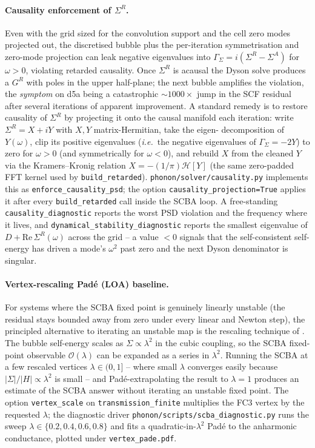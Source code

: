\paragraph{Causality enforcement of $\Sigma^{R}$.}
Even with the grid sized for the convolution support and the cell
zero modes projected out, the discretised bubble plus the
per-iteration symmetrisation and zero-mode projection can leak
negative eigenvalues into $\Gamma_{\Sigma}=i(\Sigma^{R}-\Sigma^{A})$
for $\omega>0$, violating retarded causality. Once $\Sigma^{R}$ is
acausal the Dyson solve produces a $G^{R}$ with poles in the upper
half-plane; the next bubble amplifies the violation, the
\emph{symptom} on d5a being a catastrophic
$\sim\!1000\times$ jump in the SCF residual after several iterations
of apparent improvement. A standard remedy
\cite{pourfath_negf_2014} is to restore causality of $\Sigma^{R}$ by projecting it onto the
causal manifold each iteration: write
$\Sigma^{R}=X+iY$ with $X,Y$ matrix-Hermitian, take the eigen-
decomposition of $Y(\omega)$, clip its positive eigenvalues
(\emph{i.e.}\ the negative eigenvalues of $\Gamma_{\Sigma}=-2Y$) to
zero for $\omega>0$ (and symmetrically for $\omega<0$), and rebuild
$X$ from the cleaned $Y$ via the Kramers--Kronig relation
$X=-(1/\pi)\mathcal{H}[Y]$ (the same zero-padded FFT kernel used by
\texttt{build\_retarded}). \texttt{phonon/solver/causality.py}
implements this as \texttt{enforce\_causality\_psd}; the option
\texttt{causality\_projection=True} applies it after every
\texttt{build\_retarded} call inside the SCBA loop. A free-standing
\texttt{causality\_diagnostic} reports the worst PSD violation and
the frequency where it lives, and
\texttt{dynamical\_stability\_diagnostic} reports the smallest
eigenvalue of $D+\mathrm{Re}\,\Sigma^{R}(\omega)$ across the grid
-- a value $<0$ signals that the self-consistent self-energy has
driven a mode's $\omega^{2}$ past zero and the next Dyson denominator
is singular.

\paragraph{Vertex-rescaling Pad\'e (LOA) baseline.}
For systems where the SCBA fixed point is genuinely linearly
unstable (the residual stays bounded away from zero under every
linear and Newton step), the principled alternative to iterating an
unstable map is the rescaling technique of
\cite{mera_inelastic_2012}. The bubble self-energy scales as
$\Sigma\propto\lambda^{2}$ in the cubic coupling, so the SCBA
fixed-point observable $\mathcal{O}(\lambda)$ can be expanded as a
series in $\lambda^{2}$. Running the SCBA at a few rescaled vertices
$\lambda\in(0,1]$ -- where small $\lambda$ converges easily because
$|\Sigma|/|H|\propto\lambda^{2}$ is small -- and Pad\'e-extrapolating
the result to $\lambda=1$ produces an estimate of the SCBA answer
without iterating an unstable fixed point. The option
\texttt{vertex\_scale} on \texttt{transmission\_finite} multiplies
the FC3 vertex by the requested $\lambda$; the diagnostic driver
\texttt{phonon/scripts/scba\_diagnostic.py} runs the sweep
$\lambda\in\{0.2,0.4,0.6,0.8\}$ and fits a quadratic-in-$\lambda^{2}$
Pad\'e to the anharmonic conductance, plotted under
\texttt{vertex\_pade.pdf}.

